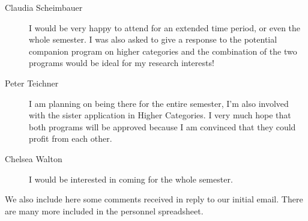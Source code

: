\documentclass[12pt]{article}
\begin{document}
\begin{description}
\item[Claudia Scheimbauer] I would be very happy to attend for an extended time period, or even the whole semester. I was also asked to give a response to the potential companion program on higher categories and the combination of the two programs would be ideal for my research interests!
\item[Peter Teichner] I am planning on being there for the entire semester, I’m also involved with the sister application in Higher Categories. I very much hope that both programs will be approved because I am convinced that they could profit from each other.
\item[Chelsea Walton] I would be interested in coming for the whole semester.
\end{description}

We also include here some comments received in reply to our initial email. There are many more included in the personnel spreadsheet.
\end{document}

